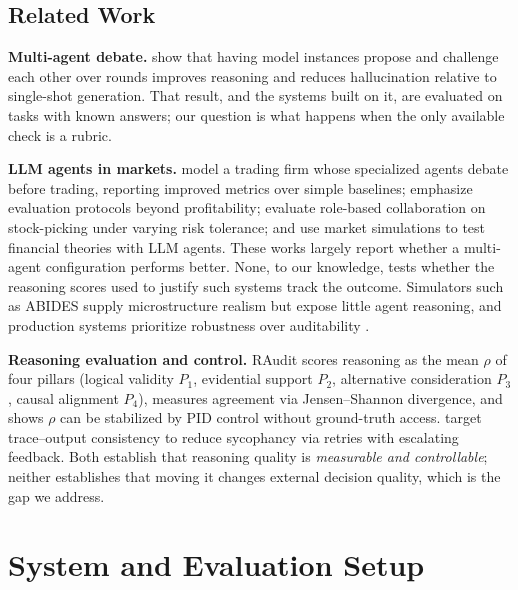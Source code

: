 \documentclass{article}
\begin{document}
\vspace{-8pt}

\vspace{-8pt}
\subsection{Related Work}
\vspace{-6pt}

\textbf{Multi-agent debate.} \cite{du2023multidebate} show that having model instances
propose and challenge each other over rounds improves reasoning and reduces
hallucination relative to single-shot generation. That result, and the systems built on
it, are evaluated on tasks with known answers; our question is what happens when the
only available check is a rubric.

\textbf{LLM agents in markets.} \cite{xiao2025tradingagentsmultiagentsllmfinancial}
model a trading firm whose specialized agents debate before trading, reporting improved
metrics over simple baselines; \cite{quantagents2025} emphasize evaluation protocols
beyond profitability; \cite{alphaagents2025} evaluate role-based collaboration on
stock-picking under varying risk tolerance; and \cite{lopezlira2025llmtrade} use market
simulations to test financial theories with LLM agents. These works largely report
whether a multi-agent configuration performs better. None, to our knowledge, tests
whether the reasoning scores used to justify such systems track the outcome. Simulators
such as ABIDES \citep{abides2019,abidesgym2021} supply microstructure realism but expose
little agent reasoning, and production systems prioritize robustness over auditability
\citep{fticonsulting2023}.

\textbf{Reasoning evaluation and control.} RAudit \citep{raudit} scores reasoning as the mean $\rho$ of four pillars (logical validity $P_1$, evidential support $P_2$, alternative consideration $P_3$, causal alignment $P_4$), measures agreement via
Jensen--Shannon divergence, and shows $\rho$ can be stabilized by PID control without
ground-truth access. \cite{rca} target trace--output consistency to reduce sycophancy
via retries with escalating feedback. Both establish that reasoning quality is
\emph{measurable and controllable}; neither establishes that moving it changes external
decision quality, which is the gap we address.

\vspace{-8pt}
\section{System and Evaluation Setup}
\label{sys_des}
\vspace{-6pt}
\end{document}
